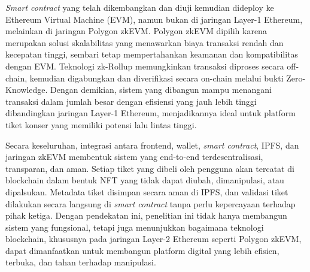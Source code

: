 \emph{Smart contract} yang telah dikembangkan dan diuji kemudian dideploy ke Ethereum
Virtual Machine (EVM), namun bukan di jaringan Layer-1 Ethereum, melainkan di
jaringan Polygon zkEVM. Polygon zkEVM dipilih karena merupakan solusi
skalabilitas yang menawarkan biaya transaksi rendah dan kecepatan tinggi,
sembari tetap mempertahankan keamanan dan kompatibilitas dengan EVM. Teknologi
zk-Rollup memungkinkan transaksi diproses secara off-chain, kemudian
digabungkan dan diverifikasi secara on-chain melalui bukti Zero-Knowledge.
Dengan demikian, sistem yang dibangun mampu menangani transaksi dalam jumlah
besar dengan efisiensi yang jauh lebih tinggi dibandingkan jaringan Layer-1
Ethereum, menjadikannya ideal untuk platform tiket konser yang memiliki potensi
lalu lintas tinggi.

Secara keseluruhan, integrasi antara frontend, wallet, \emph{smart contract},
IPFS, dan jaringan zkEVM membentuk sistem yang end-to-end terdesentralisasi,
transparan, dan aman. Setiap tiket yang dibeli oleh pengguna akan tercatat di
blockchain dalam bentuk NFT yang tidak dapat diubah, dimanipulasi, atau
dipalsukan. Metadata tiket disimpan secara aman di IPFS, dan validasi tiket
dilakukan secara langsung di \emph{smart contract} tanpa perlu kepercayaan
terhadap pihak ketiga. Dengan pendekatan ini, penelitian ini tidak hanya
membangun sistem yang fungsional, tetapi juga menunjukkan bagaimana teknologi
blockchain, khususnya pada jaringan Layer-2 Ethereum seperti Polygon zkEVM,
dapat dimanfaatkan untuk membangun platform digital yang lebih efisien,
terbuka, dan tahan terhadap manipulasi.

